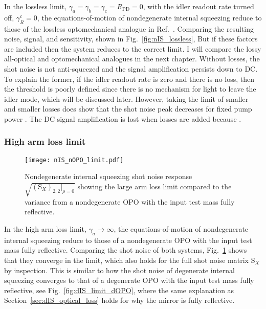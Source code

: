 In the lossless limit, $\gamma_a=\gamma_b=\gamma_c=R_\text{PD}=0$, with the idler readout rate turned off, $\gamma^c_R=0$, the equations-of-motion of nondegenerate internal squeezing reduce to those of the lossless optomechanical analogue in Ref.~\cite{Li2020}. Comparing the resulting noise, signal, and sensitivity, shown in Fig.~\ref{fig:nIS_lossless},  But if these factors are included then the system reduces to the correct limit.
I will compare the lossy all-optical and optomechanical analogues in the next chapter. 
Without losses, the shot noise is not anti-squeezed and the signal amplification persists down to DC. To explain the former, if the idler readout rate is zero and there is no loss, then the threshold is poorly defined since there is no mechanism for light to leave the idler mode, which will be discussed later. However, taking the limit of smaller and smaller losses does show that the shot noise peak decreases for fixed pump power . The DC signal amplification is lost when losses are added because .


\subsubsection{High arm loss limit}
\label{sec:nOPO_reduction}

\begin{figure}
	\centering
	\texttt{[image: nIS\_nOPO\_limit.pdf]}
	\caption{  Nondegenerate internal squeezing shot noise response $\sqrt{(\text{S}_X)_{2,2}|_{\rho=0}}$ showing the large arm loss limit compared to the variance from a nondegenerate OPO with the input test mass fully reflective.}
	\label{fig:nIS_signal_nOPO_limit}
\end{figure}

In the high arm loss limit, $\gamma_a\rightarrow\infty$, the equations-of-motion of nondegenerate internal squeezing reduce to those of a nondegenerate OPO with the input test mass fully reflective. Comparing the shot noise of both systems, Fig.~\ref{fig:nIS_signal_nOPO_limit} shows that they converge in the limit, which also holds for the full shot noise matrix $\text{S}_X$ by inspection. This is similar to how the shot noise of degenerate internal squeezing converges to that of a degenerate OPO with the input test mass fully reflective, see Fig.~\ref{fig:dIS_limit_dOPO}, where the same explanation as Section~\ref{sec:dIS_optical_loss} holds for why the mirror is fully reflective. 

